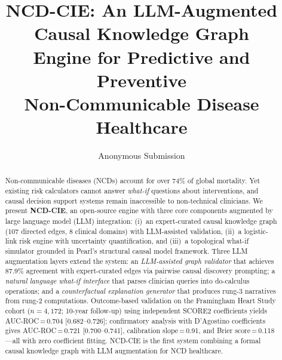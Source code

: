 \documentclass[runningheads]{llncs}
\begin{document}
\title{NCD-CIE: An LLM-Augmented Causal Knowledge Graph\\Engine for Predictive and Preventive\\Non-Communicable Disease Healthcare}

\author{Anonymous Submission}

\maketitle

\begin{abstract}
Non-communicable diseases (NCDs) account for over 74\% of global
mortality.
Yet existing risk calculators cannot answer \emph{what-if} questions
about interventions, and causal decision support systems remain
inaccessible to non-technical clinicians.
We present \textbf{NCD-CIE}, an open-source engine with three
core components augmented by large language model (LLM) integration:
(i)~an expert-curated causal knowledge graph (107 directed edges,
8 clinical domains) with LLM-assisted validation,
(ii)~a logistic-link risk engine with uncertainty quantification, and
(iii)~a topological what-if simulator grounded in Pearl's structural
causal model framework.
Three LLM augmentation layers extend the system:
an \emph{LLM-assisted graph validator} that achieves 87.9\% agreement
with expert-curated edges via pairwise causal discovery prompting;
a \emph{natural language what-if interface} that parses clinician
queries into do-calculus operations; and
a \emph{counterfactual explanation generator} that produces
rung-3 narratives from rung-2 computations.
Outcome-based validation on the Framingham Heart Study cohort
($n\!=\!4{,}172$; 10-year follow-up) using independent SCORE2
coefficients yields AUC-ROC\,=\,0.704 [0.682--0.726]; confirmatory
analysis with D'Agostino coefficients gives
AUC-ROC\,=\,0.721 [0.700--0.741],
calibration slope\,=\,0.91, and Brier score\,=\,0.118---all with
zero coefficient fitting.
NCD-CIE is the first system combining a formal causal knowledge
graph with LLM augmentation for NCD healthcare.

\end{abstract}

\end{document}

